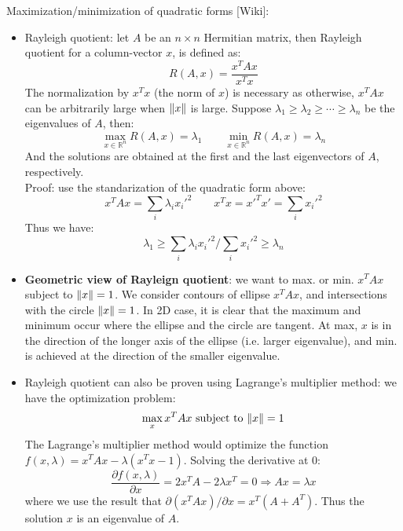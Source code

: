\documentclass{report}
\begin{document}
Maximization/minimization of quadratic forms [Wiki]:  
\begin{itemize}
\item Rayleigh quotient: let $A$ be an $n \times n$ Hermitian matrix, then Rayleigh quotient for a column-vector $x$, is defined as: 
\begin{equation}
R(A,x) = \frac{x^T A x}{x^T x}	
\end{equation}
The normalization by $x^T x$ (the norm of $x$) is necessary as otherwise, $x^T A x$ can be arbitrarily large when $\lVert x\rVert$ is large. Suppose $\lambda_1 \geq \lambda_2 \geq \cdots \geq \lambda_n$ be the eigenvalues of $A$, then:
\begin{equation}
\max_{x \in \mathbb{R}^n} R(A,x) = \lambda_1 \qquad \min_{x \in \mathbb{R}^n} R(A,x) = \lambda_n
\end{equation}
And the solutions are obtained at the first and the last eigenvectors of $A$, respectively. \\
Proof: use the standarization of the quadratic form above:  
\begin{equation}
x^T A x = \sum_i \lambda_i x_i'^2 \qquad x^T x = x'^T x' = \sum_i x_i'^2	
\end{equation}
Thus we have: 
\begin{equation}
\lambda_1 \geq \sum_i \lambda_i x_i'^2 / \sum_i x_i'^2 \geq \lambda_n	
\end{equation}

\item \textbf{Geometric view of Rayleign quotient}: we want to max. or min. $x^T A x$ subject to $\lVert x\rVert = 1$. We consider contours of ellipse $x^T A x$, and intersections with the circle $\lVert x\rVert=1$. In 2D case, it is clear that the maximum and minimum occur where the ellipse and the circle are tangent. At max, $x$ is in the direction of the longer axis of the ellipse (i.e. larger eigenvalue), and min. is achieved at the direction of the smaller eigenvalue. 

\item Rayleigh quotient can also be proven using Lagrange's multiplier method: we have the optimization problem: 
\begin{equation}
\max_{x} x^T A x \text{ subject to } \lVert x\rVert = 1
\end{equation}
The Lagrange's multiplier method would optimize the function $f(x, \lambda) = x^T A x - \lambda (x^T x - 1)$. Solving the derivative at 0:
\begin{equation}
\frac{\partial f(x,\lambda)}{\partial x} = 2 x^T A - 2 \lambda x^T = 0 \Rightarrow A x = \lambda x
\end{equation}
where we use the result that $\partial (x^T A x) / \partial x = x^T (A + A^T)$. Thus the solution $x$ is an eigenvalue of $A$. 


\end{itemize}
\end{document}
